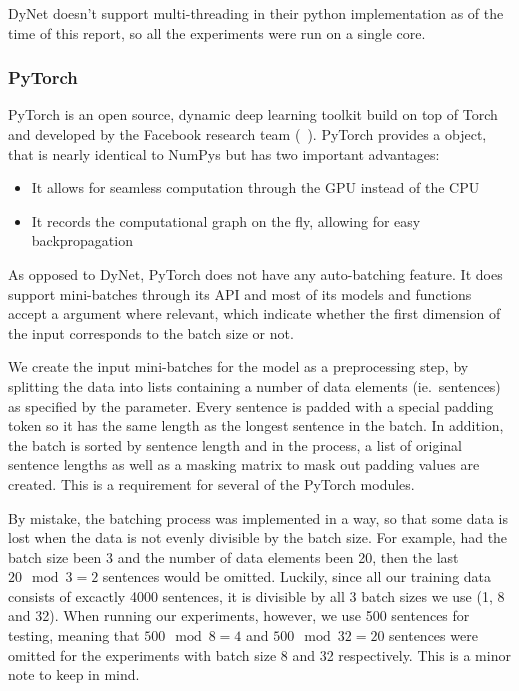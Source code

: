 DyNet doesn't support multi-threading in their python implementation as of the
time of this report, so all the experiments were run on a single core. 

\subsubsection*{PyTorch}\label{sec:setup-implementations-pytorch}

PyTorch is an open source, dynamic deep learning toolkit build on top of Torch
and developed by the Facebook research team (~\cite{yegulalp2017facebook}).
PyTorch provides a  object, that is nearly identical to NumPys
 but has two important advantages:

\begin{itemize}
    \item It allows for seamless computation through the GPU instead of the CPU
    \item It records the computational graph on the fly, allowing for easy
        backpropagation
\end{itemize}

As opposed to DyNet, PyTorch does not have any auto-batching feature. It does
support mini-batches through its API and most of its models and functions accept
a  argument where relevant, which indicate whether the first
dimension of the input corresponds to the batch size or not.

We create the input mini-batches for the model as a preprocessing step, by
splitting the data into lists containing a number of data elements (ie.\
sentences) as specified by the  parameter. Every sentence is
padded with a special padding token \code{`<PAD>'} so it has the same length as
the longest sentence in the batch. In addition, the batch is sorted by sentence
length and in the process, a list of original sentence lengths as well as a
masking matrix to mask out padding values are created. This is a requirement for
several of the PyTorch modules.

By mistake, the batching process was implemented in a way, so that some data is
lost when the data is not evenly divisible by the batch size. For example, had
the batch size been 3 and the number of data elements been 20, then the last
$20\mod3 = 2$ sentences would be omitted. Luckily, since all our training data
consists of excactly 4000 sentences, it is divisible by all 3 batch sizes we use
(1, 8 and 32). When running our experiments, however, we use 500 sentences for
testing, meaning that $500\mod8 = 4$ and $500\mod32 = 20$ sentences were omitted
for the experiments with batch size 8 and 32 respectively. This is a minor note
to keep in mind.

